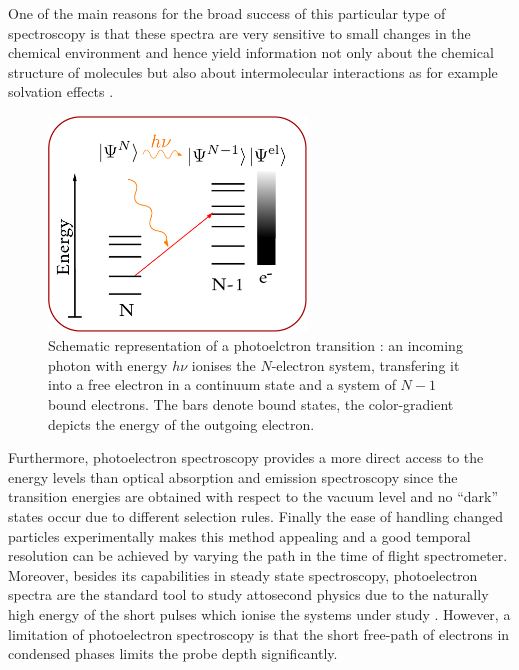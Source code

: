 One of the main reasons for the broad success of this particular type of spectroscopy is that these spectra are very sensitive to small changes in the chemical environment and hence yield information not only about the chemical structure of molecules but also about intermolecular interactions as for example solvation effects \cite{winterWater, solution1,solution2, solution3, solution4}.
\begin{figure}
   \includegraphics[width=0.61\textwidth]{Figures/PESscheme}
   \caption{Schematic representation of a photoelctron transition : an incoming photon with energy $h\nu$ ionises the $N$-electron system, transfering it into a free electron in a continuum state and a system of $N-1$ bound electrons.
   The bars denote bound states, the color-gradient depicts the energy of the outgoing electron.}
   \label{fig:PESscheme}
\end{figure}
Furthermore, photoelectron spectroscopy provides a more direct access to the energy levels than optical absorption and emission spectroscopy since the transition energies are obtained with respect to the vacuum level and no ``dark'' states occur due to different selection rules.
Finally the ease of handling changed particles experimentally makes this method appealing and a good temporal resolution can be achieved by varying the path in the time of flight spectrometer.
Moreover, besides its capabilities in steady state spectroscopy, photoelectron spectra are the standard tool to study attosecond physics due to the naturally high energy of the short pulses which ionise the systems under study \cite{as1, as2, as3, as4, as5, as6}.
However, a limitation of photoelectron spectroscopy is that the short free-path of electrons in condensed phases limits the probe depth significantly.

